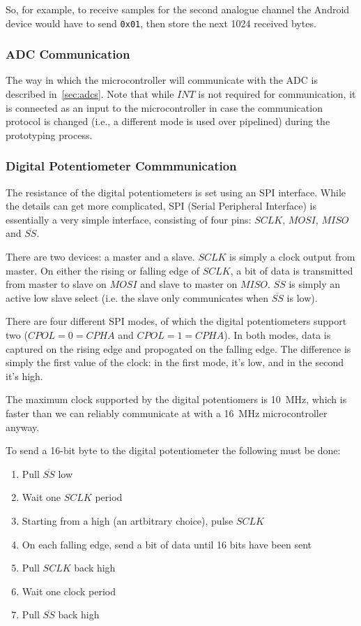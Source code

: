 So, for example, to receive samples for the second analogue channel the Android
device would have to send \texttt{0x01}, then store the next 1024 received bytes.

\subsubsection{ADC Communication}
The way in which the microcontroller will communicate with the ADC is described
in~\cref{sec:adcs}. Note that while $INT$ is not required for communication, it
is connected as an input to the microcontroller in case the communication
protocol is changed (i.e., a different mode is used over pipelined) during the
prototyping process.

\subsubsection{Digital Potentiometer Commmunication}

The resistance of the digital potentiometers is set using an SPI interface.
While the details can get more complicated, SPI (Serial Peripheral Interface) is
essentially a very simple interface, consisting of four pins: $SCLK$, $MOSI$,
$MISO$ and $\overline{SS}$.

There are two devices: a master and a slave. $SCLK$ is simply a clock output
from master. On either the rising or falling edge of $SCLK$, a bit of data is
transmitted from master to slave on $MOSI$ and slave to master on $MISO$.
$\overline{SS}$ is simply an active low slave select (i.e. the slave only
communicates when $\overline{SS}$ is low).

There are four different SPI modes, of which the digital potentiometers support
two ($CPOL=0=CPHA$ and $CPOL=1=CPHA$). In both modes, data is captured on the
rising edge and propogated on the falling edge. The difference is simply the
first value of the clock: in the first mode, it's low, and in the second it's
high.

The maximum clock supported by the digital potentiomers is \SI{10}{\MHz}, which
is faster than we can reliably communicate at with a \SI{16}{\MHz}
microcontroller anyway.

To send a 16-bit byte to the digital potentiometer the following must be done:
\begin{enumerate}
  \item Pull $\overline{SS}$ low
  \item Wait one $SCLK$ period
  \item Starting from a high (an artbitrary choice), pulse $SCLK$
  \item On each falling edge, send a bit of data until 16 bits have been sent
  \item Pull $SCLK$ back high
  \item Wait one clock period
  \item Pull $\overline{SS}$ back high
\end{enumerate}

